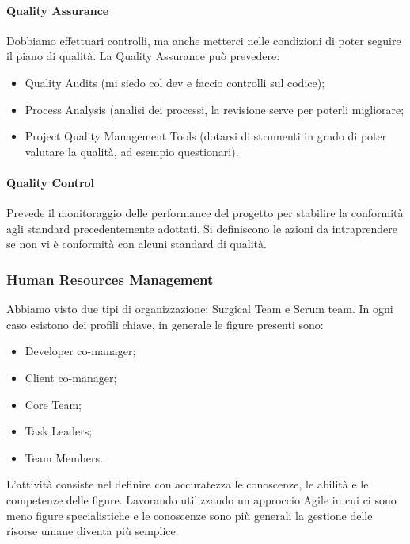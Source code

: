 \paragraph{Quality Assurance}
Dobbiamo effettuari controlli, ma anche metterci nelle condizioni di poter seguire il piano di qualità. La Quality Assurance può prevedere:
\begin{itemize}
	\item Quality Audits (mi siedo col dev e faccio controlli sul codice);
	\item Process Analysis (analisi dei processi, la revisione serve per poterli migliorare;
	\item Project Quality Management Tools (dotarsi di strumenti in grado di poter valutare la qualità, ad esempio questionari).
\end{itemize}
\paragraph{Quality Control}
Prevede il monitoraggio delle performance del progetto per stabilire la conformità agli standard precedentemente adottati. Si definiscono le azioni da intraprendere se non vi è conformità con alcuni standard di qualità. 
\subsubsection{Human Resources Management}
Abbiamo visto due tipi di organizzazione: Surgical Team e Scrum team. In ogni caso esistono dei profili chiave, in generale le figure presenti sono:
\begin{itemize}
	\item Developer co-manager;
	\item Client co-manager;
	\item Core Team;
	\item Task Leaders;
	\item Team Members.
\end{itemize}
L'attività consiste nel definire con accuratezza le conoscenze, le abilità e le competenze delle figure. Lavorando utilizzando un approccio Agile in cui ci sono meno figure specialistiche e le conoscenze sono più generali la gestione delle risorse umane diventa più semplice.
